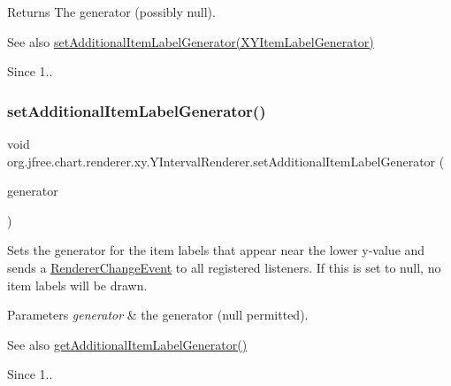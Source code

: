 \begin{DoxyReturn}{Returns}
The generator (possibly {\ttfamily null}).
\end{DoxyReturn}
\begin{DoxySeeAlso}{See also}
\mbox{\hyperlink{classorg_1_1jfree_1_1chart_1_1renderer_1_1xy_1_1_y_interval_renderer_a3613de69d575ab248cd6aeb051243e7f}{set\+Additional\+Item\+Label\+Generator(\+X\+Y\+Item\+Label\+Generator)}}
\end{DoxySeeAlso}
\begin{DoxySince}{Since}
1.. 
\end{DoxySince}
\mbox{\label{classorg_1_1jfree_1_1chart_1_1renderer_1_1xy_1_1_y_interval_renderer_a3613de69d575ab248cd6aeb051243e7f}} 
\subsubsection{\texorpdfstring{set\+Additional\+Item\+Label\+Generator()}{setAdditionalItemLabelGenerator()}}
{\footnotesize\ttfamily void org.\+jfree.\+chart.\+renderer.\+xy.\+Y\+Interval\+Renderer.\+set\+Additional\+Item\+Label\+Generator (\begin{DoxyParamCaption}\item[{\mbox{\hyperlink{interfaceorg_1_1jfree_1_1chart_1_1labels_1_1_x_y_item_label_generator}{X\+Y\+Item\+Label\+Generator}}}]{generator }\end{DoxyParamCaption})}

Sets the generator for the item labels that appear near the lower y-\/value and sends a \mbox{\hyperlink{}{Renderer\+Change\+Event}} to all registered listeners. If this is set to {\ttfamily null}, no item labels will be drawn.


\begin{DoxyParams}{Parameters}
{\em generator} & the generator ({\ttfamily null} permitted).\\
\hline
\end{DoxyParams}
\begin{DoxySeeAlso}{See also}
\mbox{\hyperlink{classorg_1_1jfree_1_1chart_1_1renderer_1_1xy_1_1_y_interval_renderer_aa4c177e06f92f9523a3d9b5bcd5b7cf1}{get\+Additional\+Item\+Label\+Generator()}}
\end{DoxySeeAlso}
\begin{DoxySince}{Since}
1.. 
\end{DoxySince}



